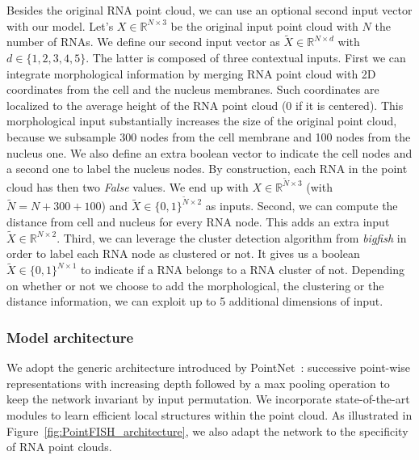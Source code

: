 Besides the original \ac{RNA} point cloud, we can use an optional second input vector with our model.
Let's $X \in \mathbb{R}^{N \times 3}$ be the original input point cloud with $N$ the number of \ac{RNA}s.
We define our second input vector as $\tilde{X} \in \mathbb{R}^{N \times d}$ with $d \in \{1, 2, 3, 4, 5\}$.
The latter is composed of three contextual inputs.
First we can integrate morphological information by merging \ac{RNA} point cloud with 2D coordinates from the cell and the nucleus membranes.
Such coordinates are localized to the average height of the \ac{RNA} point cloud (0 if it is centered).
This morphological input substantially increases the size of the original point cloud, because we subsample 300 nodes from the cell membrane and 100 nodes from the nucleus one.
We also define an extra boolean vector to indicate the cell nodes and a second one to label the nucleus nodes.
By construction, each \ac{RNA} in the point cloud has then two \emph{False} values.
We end up with $X \in \mathbb{R}^{\tilde{N} \times 3}$ (with $\tilde{N} = N + 300 + 100$) and $\tilde{X} \in \{0, 1\}^{\tilde{N} \times 2}$ as inputs.
Second, we can compute the distance from cell and nucleus for every \ac{RNA} node.
This adds an extra input $\tilde{X} \in \mathbb{R}^{N \times 2}$.
Third, we can leverage the cluster detection algorithm from \emph{bigfish} in order to label each \ac{RNA} node as clustered or not.
It gives us a boolean $\tilde{X} \in \{0, 1\}^{N \times 1}$ to indicate if a RNA belongs to a RNA cluster of not.
Depending on whether or not we choose to add the morphological, the clustering or the distance information, we can exploit up to 5 additional dimensions of input.

\subsubsection{Model architecture}

We adopt the generic architecture introduced by PointNet~\cite{Qi_2017_CVPR}: successive point-wise representations with increasing depth followed by a max pooling operation to keep the network invariant by input permutation.
We incorporate state-of-the-art modules to learn efficient local structures within the point cloud.
As illustrated in Figure~\ref{fig:PointFISH_architecture}, we also adapt the network to the specificity of RNA point clouds.

